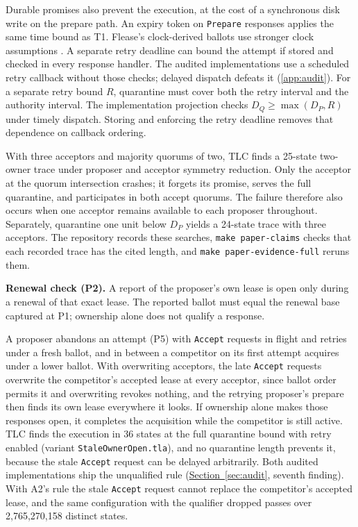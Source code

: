 \documentclass[final,5p,times,twocolumn,number]{elsarticle}
\newcommand{\code}[1]{\texttt{#1}}
\newcommand{\secref}[1]{\hyperref[#1]{Section~\ref*{#1}}}
\begin{document}
Durable promises also prevent the execution, at the cost of a synchronous disk write on the prepare path.  An expiry token on \code{Prepare} responses applies the same time bound as T1.  Flease's clock-derived ballots use stronger clock assumptions \cite{ref10}.  A separate retry deadline can bound the attempt if stored and checked in every response handler.  The audited implementations use a scheduled retry callback without those checks; delayed dispatch defeats it (\ref{app:audit}).  For a separate retry bound $R$, quarantine must cover both the retry interval and the authority interval.  The implementation projection checks $D_Q \geq \max(D_P,R)$ under timely dispatch.  Storing and enforcing the retry deadline removes that dependence on callback ordering.

With three acceptors and majority quorums of two, TLC finds a 25-state two-owner trace under proposer and acceptor symmetry reduction.  Only the acceptor at the quorum intersection crashes; it forgets its promise, serves the full quarantine, and participates in both accept quorums.  The failure therefore also occurs when one acceptor remains available to each proposer throughout.  Separately, quarantine one unit below $D_P$ yields a 24-state trace with three acceptors.  The repository records these searches, \code{make paper-claims} checks that each recorded trace has the cited length, and \code{make paper-evidence-full} reruns them.

\smallskip
\noindent\textbf{Renewal check (P2).}  A report of the proposer's own lease is open only during a renewal of that exact lease.  The reported ballot must equal the renewal base captured at P1; ownership alone does not qualify a response.

A proposer abandons an attempt (P5) with \code{Accept} requests in flight and retries under a fresh ballot, and in between a competitor on its first attempt acquires under a lower ballot.  With overwriting acceptors, the late \code{Accept} requests overwrite the competitor's accepted lease at every acceptor, since ballot order permits it and overwriting revokes nothing, and the retrying proposer's prepare then finds its own lease everywhere it looks.  If ownership alone makes those responses open, it completes the acquisition while the competitor is still active.  TLC finds the execution in 36 states at the full quarantine bound with retry enabled (variant \code{StaleOwnerOpen.tla}), and no quarantine length prevents it, because the stale \code{Accept} request can be delayed arbitrarily.  Both audited implementations ship the unqualified rule (\secref{sec:audit}, seventh finding).  With A2's rule the stale \code{Accept} request cannot replace the competitor's accepted lease, and the same configuration with the qualifier dropped passes over 2{,}765{,}270{,}158 distinct states.
\end{document}
